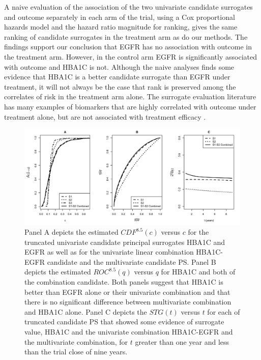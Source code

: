 \documentclass[times, doublespace]{simauth}
\begin{document}
A naive evaluation of the association of the two univariate candidate surrogates and outcome separately in each arm of the trial, using a Cox proportional hazards model and the hazard ratio magnitude for ranking, gives the same ranking of candidate surrogates in the treatment arm as do our methods. The findings support our conclusion that EGFR has no association with outcome in the treatment arm. However, in the control arm EGFR is significantly associated with outcome and HBA1C is not. Although the naive analyses finds some evidence that HBA1C is a better candidate surrogate than EGFR under treatment, it will not always be the case that rank is preserved among the correlates of risk in the treatment arm alone. The surrogate evaluation literature has many examples of biomarkers that are highly correlated with outcome under treatment alone, but are not associated with treatment efficacy \citep{flemming96}.  

\begin{figure}
\begin{center}
\includegraphics[width=.9\textwidth]{dcct-example-figure-2014-6-2.pdf}
\end{center}
\caption{Panel A depicts the estimated $CDF^{8.5}(c)$ versus $c$ for the truncated univariate candidate principal surrogates HBA1C and EGFR as well as for the univariate linear combination HBA1C-EGFR candidate and the multivariate candidate PS. Panel B depicts the estimated $ROC^{8.5}(q)$ versus $q$ for HBA1C and both of the combination candidate. Both panels suggest that HBA1C is better than EGFR alone or their univariate combination and that there is no significant difference between multivariate combination and HBA1C alone. Panel C depicts the $STG(t)$ versus $t$ for each of truncated candidate PS that showed some evidence of surrogate value, HBA1C and the univariate combination HBA1C-EGFR and the multivariate combination, for $t$ greater than one year and less than the trial close of nine years. \label{exp}}
\end{figure}
\end{document}
